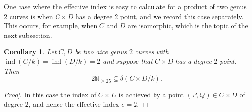 \documentclass[a4paper,11pt]{amsart}
\theoremstyle{plain}
\newtheorem{coroll}[thm]{Corollary}
\theoremstyle{remark}
\newcommand{\nn}{\mathbb{N}}
\newcommand{\dendegs}{\delta}
\newcommand{\ind}{\operatorname{ind}}
\begin{document}
One case where the effective index is easy to calculate for a product of two genus 2 curves is when $C \times D$ has a degree 2 point, and we record this case separately. This occurs, for example, when $C$ and $D$ are isomorphic, which is the topic of the next subsection.

\begin{coroll}\label{cor:summary2}
    Let $C,D$ be two nice genus $2$ curves with $\ind(C/k)=\ind(D/k)=2$ and suppose that $C\times D$ has a degree $2$ point. Then 
    \[2\nn_{\geq 25}\subseteq \dendegs(C\times D/k).\]
\end{coroll}

\begin{proof}
In this case the index of $C\times D$ is achieved by a point $(P,Q)\in C\times D$ of degree $2$, and hence the effective index $e=2$. 
\end{proof}
\end{document}
